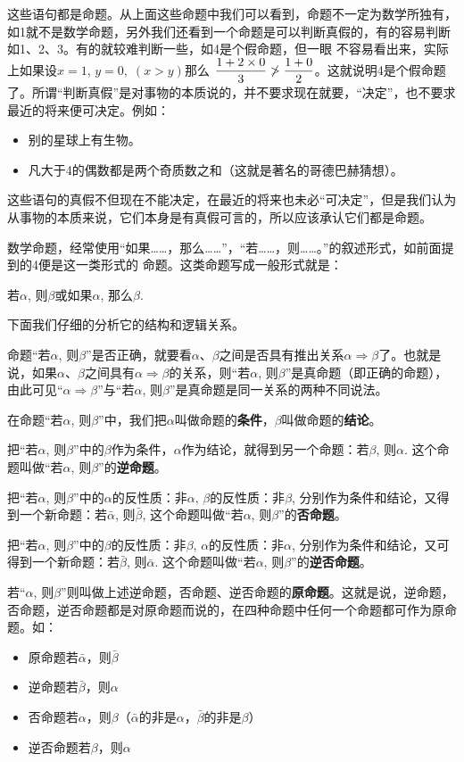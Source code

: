 这些语句都是命题。从上面这些命题中我们可以看到，命题不一定为数学所独有，如1就不是数学命题，另外我们还看到一个命题是可以判断真假的，有的容易判断如1、2、3。有的就较难判断一些，如4是个假命题，但一眼
不容易看出来，实际上如果设$x=1$, $y=0,\;(x>y)$那么
$\dfrac{1+2\times 0}{3}\not>\dfrac{1+0}{2}$。这就说明4是个假命题了。所谓“判断真假”是对事物的本质说的，并不要求现在就要，“决定”，也不要求最近的将来便可决定。例如：
\begin{itemize}
    \item 别的星球上有生物。
    \item 凡大于4的偶数都是两个奇质数之和（这就是著名的哥德巴赫猜想）。
\end{itemize}

这些语句的真假不但现在不能决定，在最近的将来也未必“可决定”，但是我们认为从事物的本质来说，它们本身是有真假可言的，所以应该承认它们都是命题。

数学命题，经常使用“如果……，那么……”，“若……，则……。”的叙述形式，如前面提到的4便是这一类形式的
命题。这类命题写成一般形式就是：
\begin{blk}{}
若$\alpha$, 则$\beta$\qquad 或\qquad  如果$\alpha$, 那么$\beta$.
\end{blk}

下面我们仔细的分析它的结构和逻辑关系。

命题“若$\alpha$, 则$\beta$”是否正确，就要看$\alpha$、$\beta$之间是否具有推出关系$\alpha\Rightarrow\beta$了。也就是说，如果$\alpha$、$\beta$之间具有$\alpha\Rightarrow\beta$的关系，则“若$\alpha$, 则$\beta$”是真命题（即正确的命题），由此可见“$\alpha\Rightarrow\beta$”与“若$\alpha$, 则$\beta$”是真命题是同一关系的两种不同说法。

在命题“若$\alpha$, 则$\beta$”中，我们把$\alpha$叫做命题的\textbf{条件}，$\beta$叫做命题的\textbf{结论}。

把“若$\alpha$, 则$\beta$”中的$\beta$作为条件，$\alpha$作为结论，就得到另一个命题：若$\beta$, 则$\alpha$. 这个命题叫做“若$\alpha$, 则$\beta$”的\textbf{逆命题}。

把“若$\alpha$, 则$\beta$”中的$\alpha$的反性质：非$\alpha$, $\beta$的反性质：非$\beta$, 分别作为条件和结论，又得到一个新命题：若$\bar\alpha$, 则$\bar\beta$, 这个命题叫做“若$\alpha$, 则$\beta$”的\textbf{否命题}。

把“若$\alpha$, 则$\beta$”中的$\beta$的反性质：非$\beta$, $\alpha$的反性质：非$\alpha$, 分别作为条件和结论，又可得到一个新命题：若$\bar\beta$, 则$\bar\alpha$. 这个命题叫做“若$\alpha$, 则$\beta$”的\textbf{逆否命题}。

若“$\alpha$, 则$\beta$”则叫做上述逆命题，否命题、逆否命题的\textbf{原命题}。这就是说，逆命题，否命题，逆否命题都是对原命题而说的，在四种命题中任何一个命题都可作为原命题。如：
\begin{itemize}
    \item 原命题\quad 若$\bar\alpha$，则$\bar\beta$
    \item 逆命题\quad 若$\bar\beta$，则$\alpha$
    \item 否命题\quad 若$\alpha$，则$\beta$（$\bar\alpha$的非是$\alpha$，$\bar\beta$的非是$\beta$）
    \item 逆否命题\quad 若$\beta$，则$\alpha$
\end{itemize}


